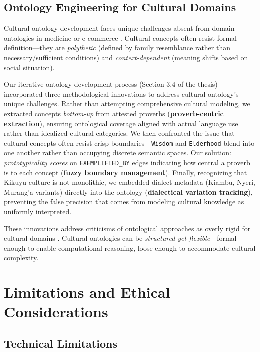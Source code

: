 \subsection{Ontology Engineering for Cultural Domains}
\label{subsec:ontology_engineering}

Cultural ontology development faces unique challenges absent from domain ontologies in medicine \citep{bodenreider2004unified} or e-commerce \citep{hepp2008goodrelations}. Cultural concepts often resist formal definition—they are \emph{polythetic} (defined by family resemblance rather than necessary/sufficient conditions) and \emph{context-dependent} (meaning shifts based on social situation).

Our iterative ontology development process (Section 3.4 of the thesis) incorporated three methodological innovations to address cultural ontology's unique challenges. Rather than attempting comprehensive cultural modeling, we extracted concepts \emph{bottom-up} from attested proverbs (\textbf{proverb-centric extraction}), ensuring ontological coverage aligned with actual language use rather than idealized cultural categories. We then confronted the issue that cultural concepts often resist crisp boundaries—\texttt{Wisdom} and \texttt{Elderhood} blend into one another rather than occupying discrete semantic spaces. Our solution: \emph{prototypicality scores} on \texttt{EXEMPLIFIED\_BY} edges indicating how central a proverb is to each concept (\textbf{fuzzy boundary management}). Finally, recognizing that Kikuyu culture is not monolithic, we embedded dialect metadata (Kiambu, Nyeri, Murang'a variants) directly into the ontology (\textbf{dialectical variation tracking}), preventing the false precision that comes from modeling cultural knowledge as uniformly interpreted.

These innovations address criticisms of ontological approaches as overly rigid for cultural domains \citep{simeone2019bim}. Cultural ontologies can be \emph{structured yet flexible}—formal enough to enable computational reasoning, loose enough to accommodate cultural complexity.

\section{Limitations and Ethical Considerations}
\label{sec:limitations_ethics}

\subsection{Technical Limitations}
\label{subsec:technical_limitations}

